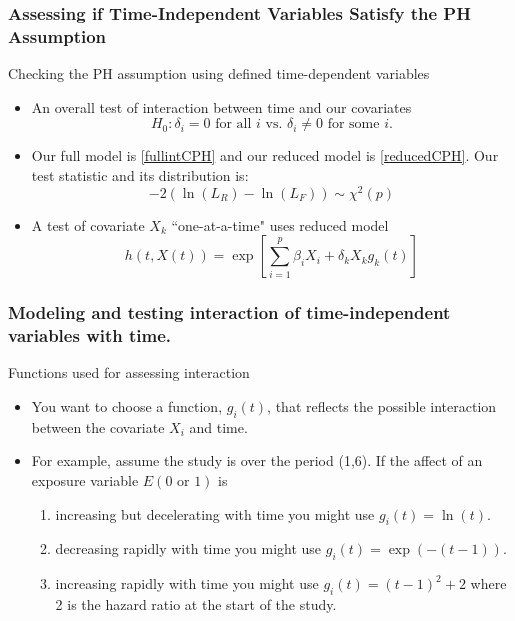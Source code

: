 \documentclass{beamer}
\theoremstyle{definition}
\begin{document}
\begin{frame}
\frametitle{Assessing if Time-Independent Variables Satisfy the PH Assumption}
\begin{block}{Checking the PH assumption using defined time-dependent variables}
\begin{itemize}
\item An overall test of interaction between time and our covariates
\[
H_0: \delta_i = 0 \text{ for all } i \text{ vs. } \delta_i \neq 0 \text{ for some } i.
\]
\item Our full model is \eqref{fullintCPH} and our reduced model is \eqref{reducedCPH}. Our test statistic and its distribution is:
\vspace{-10pt}
\[
-2(\ln(L_R) - \ln(L_F)) \sim \chi^2(p)
\]
\item A test of covariate $X_k$ ``one-at-a-time" uses reduced model
\vspace{-10pt}
\[
h(t,X(t)) = \exp\left[\sum_{i=1}^p \beta_i X_i + \delta_k X_k g_k(t)\right]
\]
\end{itemize}
\end{block}
\end{frame}

\begin{frame}
\frametitle{Modeling and testing interaction of time-independent variables with time.}
\begin{block}{Functions used for assessing interaction}
\begin{itemize}
\item You want to choose a function, $g_i(t)$, that reflects the possible interaction between the covariate $X_i$ and time.
\item For example, assume the study is over the period (1,6). If the affect of an exposure variable $E (0 \text{ or } 1)$ is
\begin{enumerate}
\item increasing but decelerating with time you might use $g_i(t)= \ln(t)$.
\item decreasing rapidly with time you might use $g_i(t)=\exp(-(t-1))$.
\item increasing rapidly with time you might use $g_i(t)=(t-1)^2+2$ where 2 is the hazard ratio at the start of the study.
\end{enumerate}
\end{itemize}
\end{block}
\end{frame}
\end{document}
